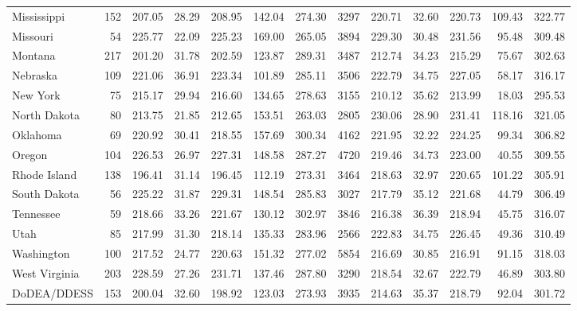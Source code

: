 \begin{sidewaystable}[ht]
\begin{tabular}{lrrrrrr@{\extracolsep{10pt}}rrrrrr}
  Mississippi & 152 & 207.05 & 28.29 & 208.95 & 142.04 & 274.30 & 3297 & 220.71 & 32.60 & 220.73 & 109.43 & 322.77 \\ 
  Missouri &  54 & 225.77 & 22.09 & 225.23 & 169.00 & 265.05 & 3894 & 229.30 & 30.48 & 231.56 & 95.48 & 309.48 \\ 
  Montana & 217 & 201.20 & 31.78 & 202.59 & 123.87 & 289.31 & 3487 & 212.74 & 34.23 & 215.29 & 75.67 & 302.63 \\ 
  Nebraska & 109 & 221.06 & 36.91 & 223.34 & 101.89 & 285.11 & 3506 & 222.79 & 34.75 & 227.05 & 58.17 & 316.17 \\ 
  New York &  75 & 215.17 & 29.94 & 216.60 & 134.65 & 278.63 & 3155 & 210.12 & 35.62 & 213.99 & 18.03 & 295.53 \\ 
  North Dakota &  80 & 213.75 & 21.85 & 212.65 & 153.51 & 263.03 & 2805 & 230.06 & 28.90 & 231.41 & 118.16 & 321.05 \\ 
  Oklahoma &  69 & 220.92 & 30.41 & 218.55 & 157.69 & 300.34 & 4162 & 221.95 & 32.22 & 224.25 & 99.34 & 306.82 \\ 
  Oregon & 104 & 226.53 & 26.97 & 227.31 & 148.58 & 287.27 & 4720 & 219.46 & 34.73 & 223.00 & 40.55 & 309.55 \\ 
  Rhode Island & 138 & 196.41 & 31.14 & 196.45 & 112.19 & 273.31 & 3464 & 218.63 & 32.97 & 220.65 & 101.22 & 305.91 \\ 
  South Dakota &  56 & 225.22 & 31.87 & 229.31 & 148.54 & 285.83 & 3027 & 217.79 & 35.12 & 221.68 & 44.79 & 306.49 \\ 
  Tennessee &  59 & 218.66 & 33.26 & 221.67 & 130.12 & 302.97 & 3846 & 216.38 & 36.39 & 218.94 & 45.75 & 316.07 \\ 
  Utah &  85 & 217.99 & 31.30 & 218.14 & 135.33 & 283.96 & 2566 & 222.83 & 34.75 & 226.45 & 49.36 & 310.49 \\ 
  Washington & 100 & 217.52 & 24.77 & 220.63 & 151.32 & 277.02 & 5854 & 216.69 & 30.85 & 216.91 & 91.15 & 318.03 \\ 
  West Virginia & 203 & 228.59 & 27.26 & 231.71 & 137.46 & 287.80 & 3290 & 218.54 & 32.67 & 222.79 & 46.89 & 303.80 \\ 
  DoDEA/DDESS & 153 & 200.04 & 32.60 & 198.92 & 123.03 & 273.93 & 3935 & 214.63 & 35.37 & 218.79 & 92.04 & 301.72 \\ 
   \hline
\end{tabular}
\end{sidewaystable}
